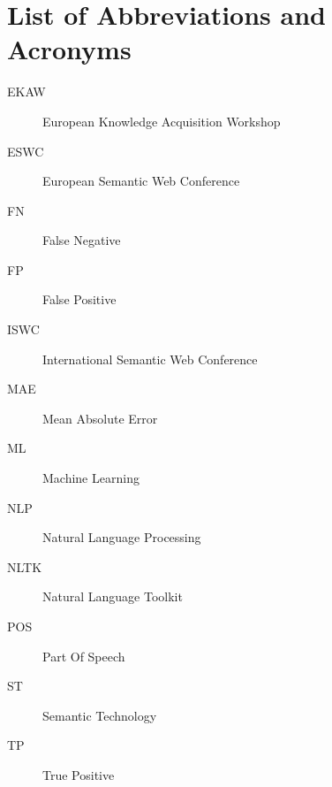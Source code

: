 \chapter*{List of Abbreviations and Acronyms}

\begin{multicols}{2}
\raggedright
\begin{description}
\item [EKAW] European Knowledge Acquisition Workshop
\item [ESWC] European Semantic Web Conference
\item [FN] False Negative
\item [FP] False Positive
\item [ISWC] International Semantic Web Conference
\item [MAE] Mean Absolute Error
\item [ML] Machine Learning
\item [NLP] Natural Language Processing
\item [NLTK] Natural Language Toolkit
\item [POS] Part Of Speech
\item [ST] Semantic Technology
\item [TP] True Positive
\end{description}
\end{multicols}

